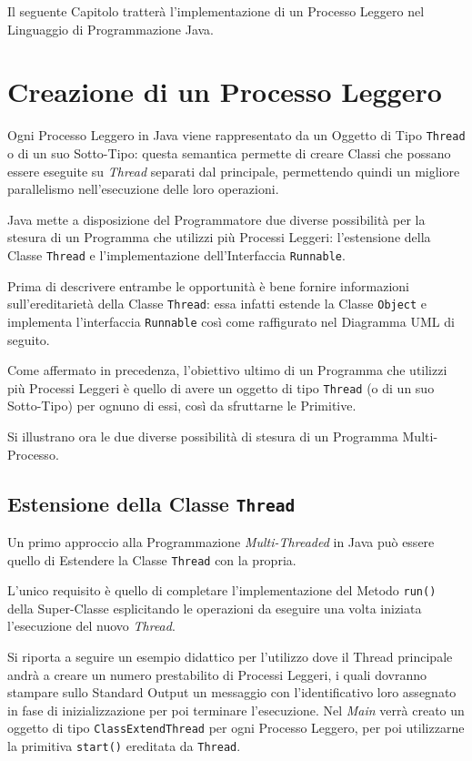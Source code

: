 Il seguente Capitolo tratterà l'implementazione di un Processo Leggero nel Linguaggio di Programmazione Java.

\section{Creazione di un Processo Leggero}
Ogni Processo Leggero in Java viene rappresentato da un Oggetto di Tipo \texttt{Thread}\cite{Thread_JavaDocs} o di un suo Sotto-Tipo: questa semantica permette di creare Classi che possano essere eseguite su \textit{Thread} separati dal principale, permettendo quindi un migliore parallelismo nell'esecuzione delle loro operazioni. \par
Java mette a disposizione del Programmatore due diverse possibilità per la stesura di un Programma che utilizzi più Processi Leggeri: l'estensione della Classe \texttt{Thread} e l'implementazione dell'Interfaccia \texttt{Runnable}. \par
Prima di descrivere entrambe le opportunità è bene fornire informazioni sull'ereditarietà della Classe \texttt{Thread}: essa infatti estende la Classe \texttt{Object} e implementa l'interfaccia \texttt{Runnable} così come raffigurato nel Diagramma UML di seguito.

Come affermato in precedenza, l'obiettivo ultimo di un Programma che utilizzi più Processi Leggeri è quello di avere un oggetto di tipo \texttt{Thread} (o di un suo Sotto-Tipo) per ognuno di essi, così da sfruttarne le Primitive. \par
Si illustrano ora le due diverse possibilità di stesura di un Programma Multi-Processo.
\subsection{Estensione della Classe \texttt{Thread}}
Un primo approccio alla Programmazione \textit{Multi-Threaded} in Java può essere quello di Estendere la Classe \texttt{Thread}\cite{Thread_JavaDocs} con la propria. \par
L'unico requisito è quello di completare l'implementazione del Metodo \texttt{run()} della Super-Classe esplicitando le operazioni da eseguire una volta iniziata l'esecuzione del nuovo \textit{Thread}. \par
Si riporta a seguire un esempio didattico per l’utilizzo dove il Thread principale andrà a creare un numero prestabilito di Processi Leggeri, i quali dovranno stampare sullo Standard Output un messaggio con l'identificativo loro assegnato in fase di inizializzazione per poi terminare l’esecuzione.
Nel \textit{Main} verrà creato un oggetto di tipo \texttt{ClassExtendThread} per ogni Processo Leggero, per poi utilizzarne la primitiva \texttt{start()} ereditata da \texttt{Thread}.

